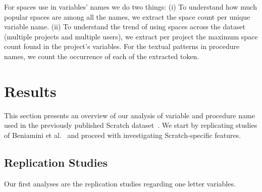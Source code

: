 \documentclass[conference]{IEEEtran}
\begin{document}
For spaces use in variables' names we do two things: (i) To understand how much popular spaces are among all the names, we extract the space count per unique variable name. (ii) To understand the trend of using spaces across the dataset (multiple projects and multiple users), we extract per project the maximum space count found in the project's variables. For the textual patterns in procedure names, we count the occurrence of each of the extracted token. 

 \section{Results}
This section presents an overview of our analysis of variable and procedure name used in the previously published Scratch dataset~\cite{Aivaloglou2016HowKC}. 
We start by replicating studies of Beniamini et al.~\cite{Beniamini} and proceed with investigating Scratch-specific features.

\subsection{Replication Studies}
Our first analyses are the replication studies regarding one letter variables.
\end{document}
